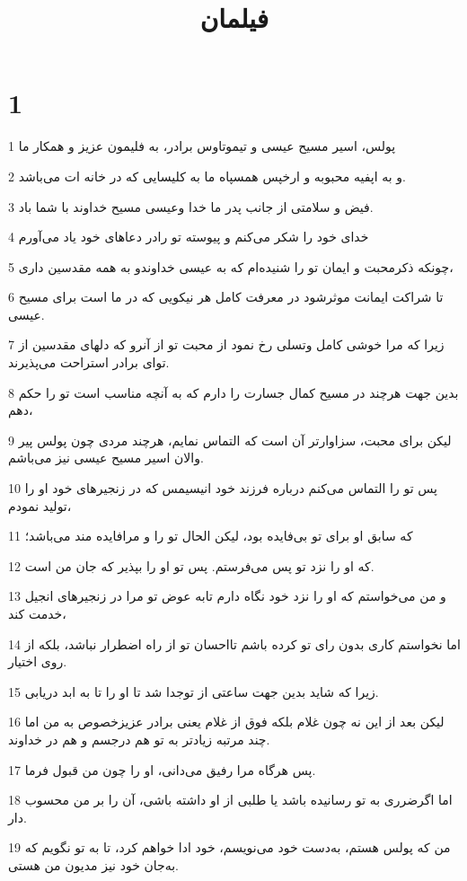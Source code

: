 

\title{فيلمان}


\chapter{1}

\par 1 پولس، اسیر مسیح عیسی و تیموتاوس برادر، به فلیمون عزیز و همکار ما
\par 2 و به اپفیه محبوبه و ارخپس همسپاه ما به کلیسایی که در خانه ات می‌باشد.
\par 3 فیض و سلامتی از جانب پدر ما خدا وعیسی مسیح خداوند با شما باد.
\par 4 خدای خود را شکر می‌کنم و پیوسته تو رادر دعاهای خود یاد می‌آورم
\par 5 چونکه ذکرمحبت و ایمان تو را شنیده‌ام که به عیسی خداوندو به همه مقدسین داری،
\par 6 تا شراکت ایمانت موثرشود در معرفت کامل هر نیکویی که در ما است برای مسیح عیسی.
\par 7 زیرا که مرا خوشی کامل وتسلی رخ نمود از محبت تو از آنرو که دلهای مقدسین از تو‌ای برادر استراحت می‌پذیرند.
\par 8 بدین جهت هرچند در مسیح کمال جسارت را دارم که به آنچه مناسب است تو را حکم دهم،
\par 9 لیکن برای محبت، سزاوارتر آن است که التماس نمایم، هرچند مردی چون پولس پیر والان اسیر مسیح عیسی نیز می‌باشم.
\par 10 پس تو را التماس می‌کنم درباره فرزند خود انیسیمس که در زنجیرهای خود او را تولید نمودم،
\par 11 که سابق او برای تو بی‌فایده بود، لیکن الحال تو را و مرافایده مند می‌باشد؛
\par 12 که او را نزد تو پس می‌فرستم. پس تو او را بپذیر که جان من است.
\par 13 و من می‌خواستم که او را نزد خود نگاه دارم تابه عوض تو مرا در زنجیرهای انجیل خدمت کند،
\par 14 اما نخواستم کاری بدون رای تو کرده باشم تااحسان تو از راه اضطرار نباشد، بلکه از روی اختیار.
\par 15 زیرا که شاید بدین جهت ساعتی از توجدا شد تا او را تا به ابد دریابی.
\par 16 لیکن بعد از این نه چون غلام بلکه فوق از غلام یعنی برادر عزیزخصوص به من اما چند مرتبه زیادتر به تو هم درجسم و هم در خداوند.
\par 17 پس هرگاه مرا رفیق می‌دانی، او را چون من قبول فرما.
\par 18 اما اگرضرری به تو رسانیده باشد یا طلبی از او داشته باشی، آن را بر من محسوب دار.
\par 19 من که پولس هستم، به‌دست خود می‌نویسم، خود ادا خواهم کرد، تا به تو نگویم که به‌جان خود نیز مدیون من هستی.
